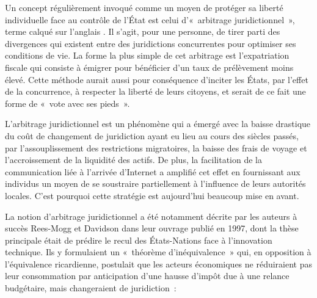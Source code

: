 Un concept régulièrement invoqué comme un moyen de protéger sa liberté individuelle face au contrôle de l'État est celui d'«~arbitrage juridictionnel~», terme calqué sur l'anglais . Il s'agit, pour une personne, de tirer parti des divergences qui existent entre des juridictions concurrentes pour optimiser ses conditions de vie. La forme la plus simple de cet arbitrage est l'expatriation fiscale qui consiste à émigrer pour bénéficier d'un taux de prélèvement moins élevé. Cette méthode aurait aussi pour conséquence d'inciter les États, par l'effet de la concurrence, à respecter la liberté de leurs citoyens, et serait de ce fait une forme de «~vote avec ses pieds~».


L'arbitrage juridictionnel est un phénomène qui a émergé avec la baisse drastique du coût de changement de juridiction ayant eu lieu au cours des siècles passés, par l'assouplissement des restrictions migratoires, la baisse des frais de voyage et l'accroissement de la liquidité des actifs. De plus, la facilitation de la communication liée à l'arrivée d'Internet a amplifié cet effet en fournissant aux individus un moyen de se soustraire partiellement à l'influence de leurs autorités locales. C'est pourquoi cette stratégie est aujourd'hui beaucoup mise en avant. %

La notion d'arbitrage juridictionnel a été notamment décrite par les auteurs à succès Rees-Mogg et Davidson dans leur ouvrage  publié en 1997, dont la thèse principale était de prédire le recul des États-Nations face à l'innovation technique. Ils y formulaient un «~théorème d'inéquivalence~» qui, en opposition à l'équivalence ricardienne, postulait que les acteurs économiques ne réduiraient pas leur consommation par anticipation d'une hausse d'impôt due à une relance budgétaire, mais changeraient de juridiction~:

